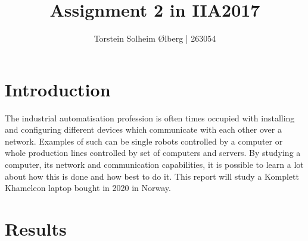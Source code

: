\documentclass[11pt, A4paper, english]{article}
\author{Torstein Solheim Ølberg | 263054}
\title{Assignment 2 in IIA2017}
\begin{document}
\maketitle
\clearpage

\tableofcontents
\clearpage

	\section{Introduction}
The industrial automatisation profession is often times occupied with installing and configuring different devices which communicate with each other over a network. Examples of such can be single robots controlled by a computer or whole production lines controlled by set of computers and servers. By studying a computer, its network and communication capabilities, it is possible to learn a lot about how this is done and how best to do it. This report will study a Komplett Khameleon laptop bought in 2020 in Norway.

	\section{Results}
\end{document}
